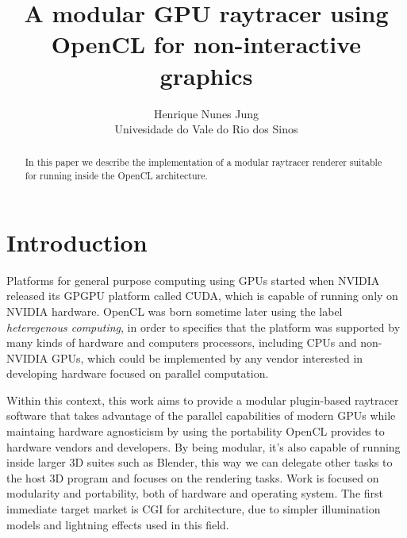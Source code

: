 \documentclass[a4paper]{sbgames}               %
\title{A modular GPU raytracer using OpenCL for non-interactive graphics}
\author{Henrique Nunes Jung\\ Univesidade do Vale do Rio dos Sinos
}
\begin{document}
\teaser{

}


\maketitle


\begin{abstract}

  In this paper we describe the implementation of a modular raytracer
  renderer suitable for running inside the OpenCL architecture.
\end{abstract}

\keywordlist
\contactlist

\section{Introduction}

Platforms for general purpose computing using GPUs started when NVIDIA
released its GPGPU platform called CUDA, which is capable of running
only on NVIDIA hardware. OpenCL was born sometime later using the
label \emph{heteregenous computing}, in order to specifies that the
platform was supported by many kinds of hardware and computers
processors, including CPUs and non-NVIDIA GPUs, which could be
implemented by any vendor interested in developing hardware focused on
parallel computation.

Within this context, this work aims to provide a modular plugin-based
raytracer software that takes advantage of the parallel capabilities
of modern GPUs while maintaing hardware agnosticism by using the
portability OpenCL provides to hardware vendors and developers. By
being modular, it's also capable of running inside larger 3D suites
such as Blender, this way we can delegate other tasks to the host 3D
program and focuses on the rendering tasks. Work is focused on
modularity and portability, both of hardware and operating system. The
first immediate target market is CGI for architecture, due to simpler
illumination models and lightning effects used in this field.
\end{document}
